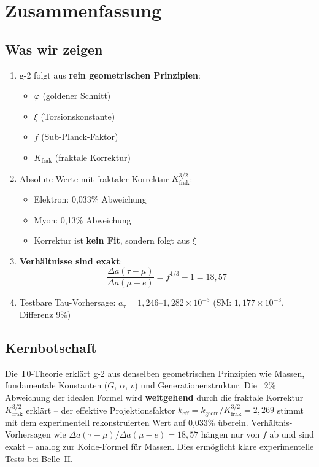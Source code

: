 	\section{Zusammenfassung}
	
	\subsection{Was wir zeigen}
	
	\begin{enumerate}
		\item g-2 folgt aus \textbf{rein geometrischen Prinzipien}:
		\begin{itemize}
			\item $\varphi$ (goldener Schnitt)
			\item $\xi$ (Torsionskonstante)
			\item $f$ (Sub-Planck-Faktor)
			\item $K_\text{frak}$ (fraktale Korrektur)
		\end{itemize}
		
		\item Absolute Werte mit fraktaler Korrektur $K_\text{frak}^{3/2}$:
		\begin{itemize}
			\item Elektron: 0{,}033\% Abweichung
			\item Myon: 0{,}13\% Abweichung
			\item Korrektur ist \textbf{kein Fit}, sondern folgt aus $\xi$
		\end{itemize}
		
		\item \textbf{Verhältnisse sind exakt}:
		\begin{equation}
			\frac{\Delta a(\tau - \mu)}{\Delta a(\mu - e)} = f^{1/3} - 1 = 18{,}57
		\end{equation}
		
		\item Testbare Tau-Vorhersage: $a_\tau = 1{,}246$--$1{,}282 \times 10^{-3}$ (SM: $1{,}177 \times 10^{-3}$, Differenz $9\%$)
	\end{enumerate}
	
	\subsection{Kernbotschaft}
	
	\begin{keypoint}
		Die T0-Theorie erklärt g-2 aus denselben geometrischen Prinzipien wie Massen, fundamentale Konstanten ($G$, $\alpha$, $v$) und Generationenstruktur. Die ~2\% Abweichung der idealen Formel wird \textbf{weitgehend} durch die fraktale Korrektur $K_\text{frak}^{3/2}$ erklärt -- der effektive Projektionsfaktor $k_\text{eff} = k_\text{geom}/K_\text{frak}^{3/2} = 2{,}269$ stimmt mit dem experimentell rekonstruierten Wert auf 0{,}033\% überein. Verhältnis-Vorhersagen wie $\Delta a(\tau - \mu) / \Delta a(\mu - e) = 18{,}57$ hängen nur von $f$ ab und sind exakt -- analog zur Koide-Formel für Massen. Dies ermöglicht klare experimentelle Tests bei Belle~II.
	\end{keypoint}
	
